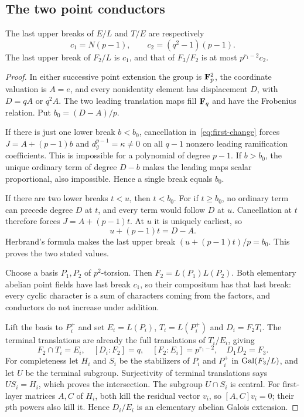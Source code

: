 \subsection{The two point conductors}
\begin{lemma}\label{lem:point-conductors}
The last upper breaks of $E/L$ and $T/E$ are respectively
\[
             c_1=N(p-1),\qquad c_2=(q^2-1)(p-1).
\]
The last upper break of $F_2/L$ is $c_1$, and that of $F_3/F_2$ is at most $p^{r_1-2}c_2$.
\end{lemma}
\begin{proof}
In either successive point extension the group is $\mathbf F_p^2$, the coordinate valuation is $A=e$, and every nonidentity element has displacement $D$, with $D=qA$ or $q^2A$. The two leading translation maps fill $\mathbf F_q$ and have the Frobenius relation. Put $b_0=(D-A)/p$.

If there is just one lower break $b<b_0$, cancellation in~\eqref{eq:first-change} forces $J=A+(p-1)b$ and $d_g^{p-1}=\kappa\ne0$ on all $q-1$ nonzero leading ramification coefficients. This is impossible for a polynomial of degree $p-1$. If $b>b_0$, the unique ordinary term of degree $D-b$ makes the leading maps scalar proportional, also impossible. Hence a single break equals $b_0$.

If there are two lower breaks $t<u$, then $t<b_0$. For if $t\ge b_0$, no ordinary term can precede degree $D$ at $t$, and every term would follow $D$ at $u$. Cancellation at $t$ therefore forces $J=A+(p-1)t$. At $u$ it is uniquely earliest, so
\[
                               u+(p-1)t=D-A.
\]
Herbrand's formula makes the last upper break $(u+(p-1)t)/p=b_0$. This proves the two stated values.

Choose a basis $P_1,P_2$ of $p^2$-torsion. Then $F_2=L(P_1)L(P_2)$. Both elementary abelian point fields have last break $c_1$, so their compositum has that last break: every cyclic character is a sum of characters coming from the factors, and conductors do not increase under addition.

Lift the basis to $P_i^+$ and set $E_i=L(P_i)$, $T_i=L(P_i^+)$ and $D_i=F_2T_i$. The terminal translations are already the full translations of $T_i/E_i$, giving
\[
 F_2\cap T_i=E_i,\quad[D_i:F_2]=q,\quad
 [F_2:E_i]=p^{r_1-2},\quad D_1D_2=F_3.
\]
For completeness let $H_i$ and $S_i$ be the stabilizers of $P_i$ and $P_i^+$ in $\operatorname{Gal}(F_3/L)$, and let $U$ be the terminal subgroup. Surjectivity of terminal translations says $US_i=H_i$, which proves the intersection. The subgroup $U\cap S_i$ is central. For first-layer matrices $A,C$ of $H_i$, both kill the residual vector $v_i$, so $[A,C]v_i=0$; their $p$th powers also kill it. Hence $D_i/E_i$ is an elementary abelian Galois extension.


\end{proof}
